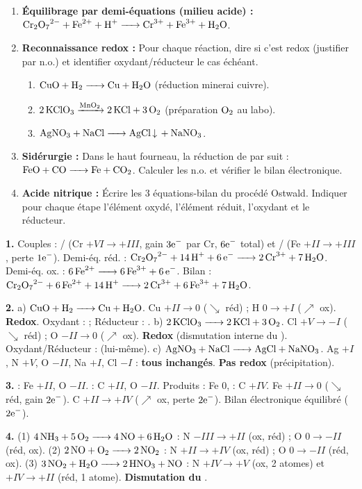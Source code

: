 \documentclass[11pt]{article}
\begin{document}
\begin{exercice}
\begin{enumerate}
\item \textbf{Équilibrage par demi-équations (milieu acide) :} $\ce{Cr2O7^2- + Fe^2+ + H+ -> Cr^3+ + Fe^3+ + H2O}$.
\item \textbf{Reconnaissance redox :} Pour chaque réaction, dire si c'est redox (justifier par n.o.) et identifier oxydant/réducteur le cas échéant.
  \begin{enumerate}
  \item $\ce{CuO + H2 -> Cu + H2O}$ (réduction minerai cuivre).
  \item $\ce{2 KClO3 ->[MnO2] 2 KCl + 3 O2}$ (préparation $\ce{O2}$ au labo).
  \item $\ce{AgNO3 + NaCl -> AgCl v + NaNO3}$.
  \end{enumerate}
\item \textbf{Sidérurgie :} Dans le haut fourneau, la réduction de  par  suit : $\ce{FeO + CO -> Fe + CO2}$. Calculer les n.o. et vérifier le bilan électronique.
\item \textbf{Acide nitrique :} Écrire les 3 équations-bilan du procédé Ostwald. Indiquer pour chaque étape l'élément oxydé, l'élément réduit, l'oxydant et le réducteur.
\end{enumerate}
\end{exercice}

\begin{corrige}[Exercice]
\textbf{1.} Couples : / (Cr $+VI \to +III$, gain $3\ce{e-}$ par Cr, $6\ce{e-}$ total) et / (Fe $+II \to +III$, perte $1\ce{e-}$).
Demi-éq. réd. : $\ce{Cr2O7^2- + 14 H+ + 6 e- -> 2 Cr^3+ + 7 H2O}$.
Demi-éq. ox. : $\ce{6 Fe^2+ -> 6 Fe^3+ + 6 e-}$.
Bilan : $\ce{Cr2O7^2- + 6 Fe^2+ + 14 H+ -> 2 Cr^3+ + 6 Fe^3+ + 7 H2O}$.

\textbf{2.}
a) $\ce{CuO + H2 -> Cu + H2O}$. Cu $+II \to 0$ ($\searrow$ réd) ; H $0 \to +I$ ($\nearrow$ ox). \textbf{Redox}. Oxydant :  ; Réducteur : .
b) $\ce{2 KClO3 -> 2 KCl + 3 O2}$. Cl $+V \to -I$ ($\searrow$ réd) ; O $-II \to 0$ ($\nearrow$ ox). \textbf{Redox} (dismutation interne du ). Oxydant/Réducteur :  (lui-même).
c) $\ce{AgNO3 + NaCl -> AgCl + NaNO3}$. Ag $+I$, N $+V$, O $-II$, Na $+I$, Cl $-I$ : \textbf{tous inchangés}. \textbf{Pas redox} (précipitation).

\textbf{3.}  : Fe $+II$, O $-II$.  : C $+II$, O $-II$. Produits : Fe $0$,  : C $+IV$.
Fe $+II \to 0$ ($\searrow$ réd, gain $2\ce{e-}$). C $+II \to +IV$ ($\nearrow$ ox, perte $2\ce{e-}$). Bilan électronique équilibré ($2\ce{e-}$).

\textbf{4.}
(1) $\ce{4 NH3 + 5 O2 -> 4 NO + 6 H2O}$ : N $-III \to +II$ (ox,  réd) ; O $0 \to -II$ (réd,  ox).
(2) $\ce{2 NO + O2 -> 2 NO2}$ : N $+II \to +IV$ (ox,  réd) ; O $0 \to -II$ (réd,  ox).
(3) $\ce{3 NO2 + H2O -> 2 HNO3 + NO}$ : N $+IV \to +V$ (ox, 2 atomes) et $+IV \to +II$ (réd, 1 atome). \textbf{Dismutation du }.
\end{corrige}
\end{document}
